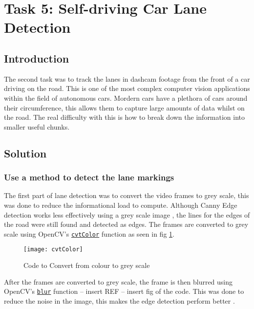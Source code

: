 \documentclass[conference]{IEEEtran}
\begin{document}
\section{Task 5: Self-driving Car Lane Detection}
\subsection{Introduction}

The second task was to track the lanes in dashcam footage from the front of a car driving on the road. This is one of the most complex computer vision applications within the field of autonomous cars. Mordern cars have a plethora of cars around their circumference, this allows them to capture large amounts of data whilst on the road. The real difficulty with this is how to break down the information into smaller useful chunks.  

\subsection{Solution}

\subsubsection{Use a method to detect the lane markings}

The first part of lane detection was to convert the video frames to grey scale, this was done to reduce the informational load to compute. Although Canny Edge detection works less effectively using a grey scale image \cite{Canny_On_Grey}, the lines for the edges of the road were still found and detected as edges. The frames are converted to grey scale using OpenCV's \href{https://docs.opencv.org/4.x/d8/d01/group__imgproc__color__conversions.html#ga397ae87e1288a81d2363b61574eb8cab}{\texttt{cvtColor}} function as seen in fig \ref{fig:cvtColor}.

\begin{figure}[H]
\centerline{\texttt{[image: cvtColor]}}
\caption{Code to Convert from colour to grey scale}
\label{fig:cvtColor}
\end{figure}

After the frames are converted to grey scale, the frame is then blurred using OpenCV's \href{https://docs.opencv.org/4.x/d4/d86/group__imgproc__filter.html#ga8c45db9afe636703801b0b2e440fce37}{\texttt{blur}} function -- insert REF -- insert fig of the code. This was done to reduce the noise in the image, this makes the edge detection perform better \cite{Image_Blurring}.
\end{document}
